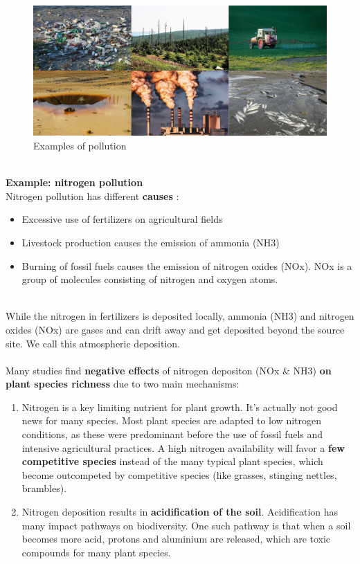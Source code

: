 \documentclass[../summary.tex]{subfiles}
\begin{document}
\begin{figure}[H]
	\centering
	\includegraphics[width=0.7\linewidth]{../images/pollution}
	\caption{Examples of pollution}
	\label{fig:pollution}
\end{figure}
\ \\
\textbf{Example: nitrogen pollution}\\
Nitrogen pollution has different \textbf{causes} :
\begin{itemize}
	\item Excessive use of fertilizers on agricultural fields
	\item Livestock production causes the emission of ammonia (NH3)
	\item Burning of fossil fuels causes the emission of nitrogen oxides (NOx). NOx is a group of molecules consisting of nitrogen and oxygen atoms.
\end{itemize}
\ \\
While the nitrogen in fertilizers is deposited locally, ammonia (NH3) and nitrogen oxides (NOx) are gases and can drift away and get deposited beyond the source site. We call this atmospheric deposition. \\
\\
Many studies find \textbf{negative effects} of nitrogen depositon (NOx \& NH3) \textbf{on plant species richness} due to two main mechanisms: \\
\begin{enumerate}
\item Nitrogen is a key limiting nutrient for plant growth. It’s actually not good news for many species. Most plant species are adapted to low nitrogen conditions, as these were predominant before the use of fossil fuels and intensive agricultural practices. A high nitrogen availability will favor a \textbf{few competitive species }instead of the many typical plant species, which become outcompeted by competitive species (like grasses, stinging nettles, brambles).
\item Nitrogen deposition results in \textbf{acidification of the soil}. Acidification has many impact pathways on biodiversity. One such pathway is that when a soil becomes more acid, protons and aluminium are released, which are toxic compounds for many plant species.
\end{enumerate}
\end{document}
